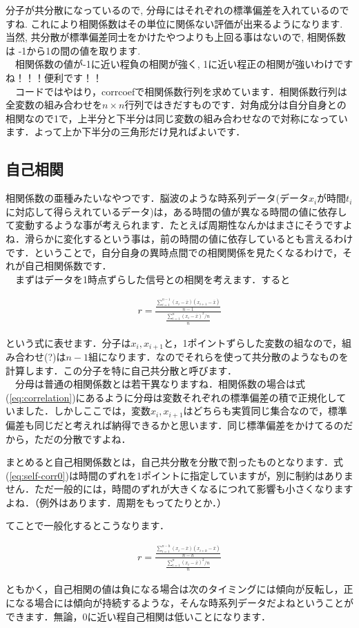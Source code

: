 \documentclass[11pt,a4paper]{jreport}
\begin{document}
分子が共分散になっているので, 分母にはそれぞれの標準偏差を入れているのですね. これにより相関係数はその単位に関係ない評価が出来るようになります. 当然, 共分散が標準偏差同士をかけたやつよりも上回る事はないので, 相関係数は -1から1の間の値を取ります.\\
　相関係数の値が-1に近い程負の相関が強く, 1に近い程正の相関が強いわけですね！！！便利です！！\\
　コードではやはり，corrcoefで相関係数行列を求めています．相関係数行列は全変数の組み合わせを$n \times n$行列ではきだすものです．対角成分は自分自身との相関なので1で，上半分と下半分は同じ変数の組み合わせなので対称になっています．よって上か下半分の三角形だけ見ればよいです．

\subsection{自己相関}
相関係数の亜種みたいなやつです．脳波のような時系列データ(データ$x_i$が時間$t_i$に対応して得らえれているデータ)は，ある時間の値が異なる時間の値に依存して変動するような事が考えられます．たとえば周期性なんかはまさにそうですよね．滑らかに変化するという事は，前の時間の値に依存しているとも言えるわけです．ということで，自分自身の異時点間での相関関係を見たくなるわけで，それが自己相関係数です．\\

　まずはデータを1時点ずらした信号との相関を考えます．すると

\begin{eqnarray}
\label{eq:self-corr0}
r = \frac{\frac{\sum_{i=1}^{n-1} (x_i-\bar x)(x_{i+1} - \bar x)}{n-1}}{\frac{\sum_{i=1}^n (x_i - \bar x)^2 /n}{n}}
\end{eqnarray}

という式に表せます．分子は$x_i, x_{i+1}$と，1ポイントずらした変数の組なので，組み合わせ(?)は$n-1$組になります．なのでそれらを使って共分散のようなものを計算します．この分子を特に自己共分散と呼びます．\\
　分母は普通の相関係数とは若干異なりますね．相関係数の場合は式(\ref{eq:correlation})にあるように分母は変数それぞれの標準偏差の積で正規化していました．しかしここでは，変数$x_i, x_{i+1}$はどちらも実質同じ集合なので，標準偏差も同じだと考えれば納得できるかと思います．同じ標準偏差をかけてるのだから，ただの分散ですよね．

まとめると自己相関係数とは，自己共分散を分散で割ったものとなります．式(\ref{eq:self-corr0})は時間のずれを1ポイントに指定していますが，別に制約はありません．ただ一般的には，時間のずれが大きくなるにつれて影響も小さくなりますよね．（例外はあります．周期をもってたりとか．）

てことで一般化するとこうなります．

\begin{eqnarray}
\label{eq:self-corr}
r = \frac{\frac{\sum_{i=1}^{n-h} (x_i-\bar x)(x_{i+h} - \bar x)}{n-h}}{\frac{\sum_{i=1}^n (x_i - \bar x)^2 /n}{n}}
\end{eqnarray}

ともかく，自己相関の値は負になる場合は次のタイミングには傾向が反転し，正になる場合には傾向が持続するような，そんな時系列データだよねということができます．無論，0に近い程自己相関は低いことになります．\\
\end{document}
